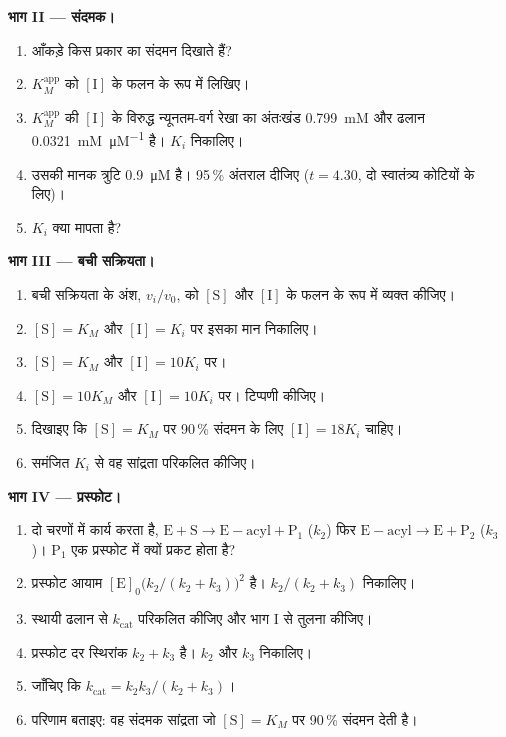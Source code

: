 \begin{problem}
\medskip\noindent\textbf{भाग II --- संदमक।}
\begin{enumerate}[resume]
  \item आँकड़े किस प्रकार का संदमन दिखाते हैं?
  \item $K_M^{\mathrm{app}}$ को $[\mathrm I]$ के फलन के रूप में लिखिए।
  \item $K_M^{\mathrm{app}}$ की $[\mathrm I]$ के विरुद्ध न्यूनतम-वर्ग रेखा का अंतःखंड \qty{0.799}{mM} और
        ढलान \qty{0.0321}{mM.\micro M^{-1}} है। $K_i$ निकालिए।
  \item उसकी मानक त्रुटि \qty{0.9}{\micro M} है। 95\,\% अंतराल दीजिए ($t = 4.30$,
        दो स्वातंत्र्य कोटियों के लिए)।
  \item $K_i$ क्या मापता है?
\end{enumerate}

\medskip\noindent\textbf{भाग III --- बची सक्रियता।}
\begin{enumerate}[resume]
  \item बची सक्रियता के अंश, $v_i/v_0$, को $[\mathrm S]$ और
        $[\mathrm I]$ के फलन के रूप में व्यक्त कीजिए।
  \item $[\mathrm S] = K_M$ और $[\mathrm I] = K_i$ पर इसका मान निकालिए।
  \item $[\mathrm S] = K_M$ और $[\mathrm I] = 10K_i$ पर।
  \item $[\mathrm S] = 10K_M$ और $[\mathrm I] = 10K_i$ पर। टिप्पणी कीजिए।
  \item दिखाइए कि $[\mathrm S] = K_M$ पर 90\,\% संदमन के लिए $[\mathrm I] = 18K_i$ चाहिए।
  \item समंजित $K_i$ से वह सांद्रता परिकलित कीजिए।
\end{enumerate}

\medskip\noindent\textbf{भाग IV --- प्रस्फोट।}
\begin{enumerate}[resume]
  \item {} दो चरणों में कार्य करता है, $\mathrm{E + S \to E{-}acyl + P_1}$ ($k_2$) फिर $\mathrm{E{-}acyl \to E +
        P_2}$ ($k_3$)। $\mathrm P_1$ एक प्रस्फोट में क्यों प्रकट होता है?
  \item प्रस्फोट आयाम $[\mathrm E]_0\bigl(k_2/(k_2 + k_3)\bigr)^2$ है। $k_2/(k_2 + k_3)$ निकालिए।
  \item स्थायी ढलान से $k_{\mathrm{cat}}$ परिकलित कीजिए और भाग I से तुलना कीजिए।
  \item प्रस्फोट दर स्थिरांक $k_2 + k_3$ है। $k_2$ और $k_3$ निकालिए।
  \item जाँचिए कि $k_{\mathrm{cat}} = k_2k_3/(k_2 + k_3)$।
  \item परिणाम बताइए: वह संदमक सांद्रता जो
        $[\mathrm S] = K_M$ पर 90\,\% संदमन देती है।
\end{enumerate}
\end{problem}
